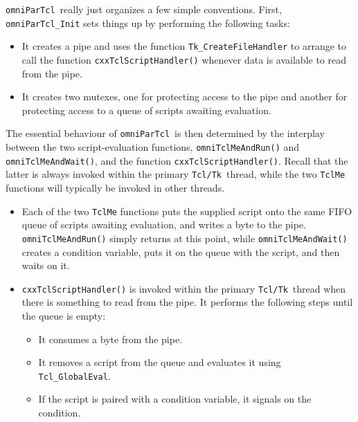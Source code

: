 \documentclass[11pt]{article}
\def\omniParTcl{{\tt omniParTcl}}
\def\tcltk{{\tt Tcl/Tk}}
\begin{document}
\omniParTcl\ really just organizes a few simple conventions.   
First, {\tt omniParTcl\_Init} sets things up by
performing the following tasks:

\begin{itemize}
\item
It creates a pipe and uses the function {\tt Tk\_CreateFileHandler} to
arrange to call the function {\tt cxxTclScriptHandler()} whenever data
is available to read from the pipe.

\item
It creates two mutexes, one for protecting access to the pipe and 
another for protecting access to a queue of scripts awaiting evaluation.
\end{itemize}

\noindent
The essential behaviour of \omniParTcl\ is then determined by the
interplay between the two script-evaluation functions,
{\tt omniTclMeAndRun()} and {\tt omniTclMeAndWait()}, and 
the function {\tt cxxTclScriptHandler()}.  Recall that the latter
is always invoked within the primary \tcltk\ thread, while the
two {\tt TclMe} functions will typically be invoked in
other threads.

\begin{itemize}

\item Each of the two {\tt TclMe} functions puts the supplied
script onto the same FIFO queue of scripts awaiting evaluation, and
writes a byte to the pipe.  {\tt omniTclMeAndRun()} simply returns at
this point, while {\tt omniTclMeAndWait()} creates a condition variable,
puts it on the queue with the script, and then waits on it.

\item {\tt cxxTclScriptHandler()} is invoked within the primary
\tcltk\ thread when there is something to read from the pipe.  It
performs the following steps until the queue is empty:

\begin{itemize}

\item It consumes a byte from the pipe.

\item It removes a script from the queue and
evaluates it using {\tt Tcl\_GlobalEval}.

\item If the script is paired with a condition variable, 
it signals on the condition.
\end{itemize}

\end{itemize}
\end{document}
